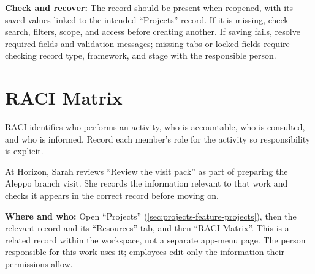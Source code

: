 \textbf{Check and recover:} The record should be present when reopened, with its saved values linked to the intended “Projects” record. If it is missing, check search, filters, scope, and access before creating another. If saving fails, resolve required fields and validation messages; missing tabs or locked fields require checking record type, framework, and stage with the responsible person.

\clearpage
\section{RACI Matrix}
\label{sec:projects-feature-raci-entries}

RACI identifies who performs an activity, who is accountable, who is consulted, and who is informed. Record each member's role for the activity so responsibility is explicit.

\begin{rcnote}
At Horizon, Sarah reviews “Review the visit pack” as part of preparing the Aleppo branch visit. She records the information relevant to that work and checks it appears in the correct record before moving on.
\end{rcnote}

\textbf{Where and who:} Open “Projects” (\ref{sec:projects-feature-projects}), then the relevant record and its “Resources” tab, and then “RACI Matrix”. This is a related record within the workspace, not a separate app-menu page. The person responsible for this work uses it; employees edit only the information their permissions allow.

